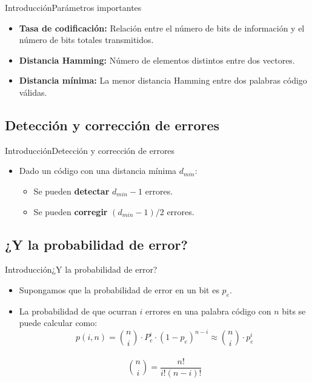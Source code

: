 \documentclass[10pt,compress]{beamer} %
\begin{document}
\begin{frame}{Introducción}{Parámetros importantes}
  \begin{itemize}
    \item {\bf Tasa de codificación:} Relación entre el número de bits de información y el número de bits totales transmitidos.
    \item {\bf Distancia Hamming: }Número de elementos distintos entre dos vectores.
    \item {\bf Distancia mínima:} La menor distancia Hamming entre dos palabras código válidas.
  \end{itemize}
\end{frame}

\subsection{Detección y corrección de errores}
\begin{frame}{Introducción}{Detección y corrección de errores}
  \begin{itemize}
    \item Dado un código con una distancia mínima $d_{min}$:
    \begin{itemize}
      \item Se pueden {\bf detectar} $d_{min}-1$ errores.
      \item Se pueden {\bf corregir} $(d_{min}-1)/2$ errores.
    \end{itemize}
  \end{itemize}
\end{frame}

\subsection{¿Y la probabilidad de error?}
\begin{frame}{Introducción}{¿Y la probabilidad de error?}
  \begin{itemize}
    \item Supongamos que la probabilidad de error en un bit es $p_e$.
    \item La probabilidad de que ocurran $i$ errores en una palabra código con $n$ bits se puede calcular como:\\
    \begin{displaymath}
      p(i,n) = \binom{n}{i} \cdot P_e^i \cdot (1-p_e)^{n-i} \approx \binom{n}{i} \cdot p_e^i
    \end{displaymath}
    \ \\
    \begin{displaymath}
      \binom{n}{i} = \frac{n!}{i! (n-i)!}
    \end{displaymath}
  \end{itemize}
\end{frame}
\end{document}
